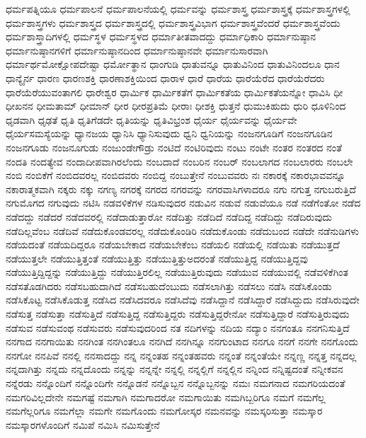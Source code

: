 {ಧರ್ಮಪತ್ನಿಯೂ
ಧರ್ಮಪಾಲನೆ
ಧರ್ಮಪಾಲನೆಯಲ್ಲಿ
ಧರ್ಮವನ್ನು
ಧರ್ಮಶಾಸ್ತ್ರ
ಧರ್ಮಶಾಸ್ತ್ರಕ್ಕೆ
ಧರ್ಮಶಾಸ್ತ್ರಗಳಲ್ಲಿ
ಧರ್ಮಶಾಸ್ತ್ರಗಳು
ಧರ್ಮಶಾಸ್ತ್ರದ
ಧರ್ಮಶಾಸ್ತ್ರದಲ್ಲಿ
ಧರ್ಮಶಾಸ್ತ್ರವಿಭಾಗ
ಧರ್ಮಶಾಸ್ತ್ರವೆಂದರೆ
ಧರ್ಮಶಾಸ್ತ್ರವೆಂದು
ಧರ್ಮಶಾಸ್ತ್ರಾದಿಗಳಲ್ಲಿ
ಧರ್ಮಸ್ಥಳ
ಧರ್ಮಸ್ಥಳದ
ಧರ್ಮಾತೀತವಾದದ್ದು
ಧರ್ಮಾಧಿಕಾರಿ
ಧರ್ಮಾನುಷ್ಠಾನ
ಧರ್ಮಾನುಷ್ಠಾನಗಳಿಗೆ
ಧರ್ಮಾನುಷ್ಠಾನದಿಂದ
ಧರ್ಮಾನುಷ್ಠಾನವೇ
ಧರ್ಮಾನುಸಾರವಾಗಿ
ಧರ್ಮಾರ್ಥಮೋಕ್ಷೋಪದೇಷ್ಟಾ
ಧರ್ಮೋತ್ಥಾನ
ಧಾಂಗುಡಿ
ಧಾತುವನ್ನೂ
ಧಾತುವಿನಿಂದ
ಧಾತುವಿನಿಂದಲೂ
ಧಾನ
ಧಾನ್ಯೈರ್ನ
ಧಾರಣ
ಧಾರಣಶಕ್ತಿ
ಧಾರಣಾಶಕ್ತಿಯಿಂದ
ಧಾರಾಳ
ಧಾರೆ
ಧಾರೆಯ
ಧಾರೆಯೆರೆದ
ಧಾರೆಯೆರೆದರು
ಧಾರೆಯೆರೆಯುವಂತಾಗಲಿ
ಧಾರೇಶ್ವರ
ಧಾರ್ಮಿಕ
ಧಾರ್ಮಿಕತೆಗೆ
ಧಾರ್ಮಿಕತೆಯ
ಧಾರ್ಮಿಕತೆಯನ್ನೋ
ಧಾವಿಸಿ
ಧೀ
ಧೀಖನನ
ಧೀಮತಾಮ್
ಧೀಮಾನ್
ಧೀರ
ಧೀರಪ್ರತಿಮೆ
ಧೀರಾಃ
ಧೀಶಕ್ತಿ
ಧುತ್ತನೆ
ಧುಮುಕಿಹುದು
ಧುರಿ
ಧೂಳಿನಿಂದ
ಧೃಡವಾಗಿ
ಧೃಢತೆ
ಧೃತಿ
ಧೃತಿಗೆಡದೇ
ಧೃತಿಯನ್ನು
ಧೃತಿವಿಭ್ರಂಶ
ಧೈರ್ಯ
ಧೈರ್ಯವನ್ನು
ಧೈರ್ಯವೇ
ಧೈರ್ಯಸಮಸ್ಯೆಯನ್ನು
ಧ್ಯಾನಜಯ
ಧ್ಯಾನಿಸಿ
ಧ್ಯಾನಿಸುವುದು
ಧ್ವನಿ
ಧ್ವನಿಯನ್ನು
ನಂಜನಗೂಡಿಗೆ
ನಂಜನಗೂಡಿನ
ನಂಜನಗೂಡು
ನಂಜನೂಗುಡು
ನಂಜುಂಡೇಗೌಡ್ರು
ನಂಟಿದೆ
ನಂಟಿರಿವುದು
ನಂಟು
ನಂಟೇ
ನಂತರ
ನಂತರದ
ನಂತೆ
ನಂದತಿ
ನಂದತ್ಯೇವ
ನಂದಾದೀಪವಾಗಿರಲೆಂದು
ನಂಬದಾದೆ
ನಂಬರಿನ
ನಂಬರ್
ನಂಬಲಾಗದ
ನಂಬಲಾರರು
ನಂಬಲೇ
ನಂಬಿ
ನಂಬಿಕೆಗೆ
ನಂಬಿದವರಲ್ಲ
ನಂಬಿದವರು
ನಂಬಿದ್ದ
ನಂಬುತ್ತೇನೆ
ನಂಬುವವರು
ನಃ
ನಕಾರಕ್ಕೆ
ನಕಾರಭಾವವನ್ನೂ
ನಕಾರಾತ್ಮಕವಾಗಿ
ನಕ್ಕರು
ನಕ್ಕು
ನಗಣ್ಯ
ನಗರಕ್ಕೆ
ನಗರದ
ನಗರವನ್ನು
ನಗರವಾಸಿಗಳಾದರೂ
ನಗು
ನಗುತ್ತ
ನಗುಬರುತ್ತಿದೆ
ನಗುಮೊಗದ
ನಗುವುದು
ನಟಿಸಿ
ನಡವಳಿಕೆಗಳ
ನಡಿಸುವುದರ
ನಡುವಿನ
ನಡುವೆ
ನಡುವೆಯೂ
ನಡೆ
ನಡೆಗೆಂತೋ
ನಡೆದ
ನಡೆದದ್ದು
ನಡೆದರೆ
ನಡೆದವರಲ್ಲಿ
ನಡೆದಾಡುತ್ತಾರೋ
ನಡೆದಿತ್ತು
ನಡೆದಿದೆ
ನಡೆದಿದ್ದ
ನಡೆದಿದ್ದು
ನಡೆದಿರುವುದು
ನಡೆದಿಲ್ಲವೆಂಬ
ನಡೆದಿವೆ
ನಡೆದುಕೊಂಡವರಲ್ಲ
ನಡೆದುಕೊಂಡಿರಿ
ನಡೆದುಕೊಂಡು
ನಡೆದುಬಂದ
ನಡೆದೇ
ನಡೆನುಡಿಗಳು
ನಡೆಯದಂತೆ
ನಡೆಯದಿದ್ದರೂ
ನಡೆಯಬೇಕಾದ
ನಡೆಯಬೇಕೆಂಬ
ನಡೆಯಲಿ
ನಡೆಯಲ್ಲಿ
ನಡೆಯಿತು
ನಡೆಯುತ್ತದೆ
ನಡೆಯುತ್ತಲೇ
ನಡೆಯುತ್ತಿತ್ತಂತೆ
ನಡೆಯುತ್ತಿತ್ತು
ನಡೆಯುತ್ತಿತ್ತುಅದರಂತೆ
ನಡೆಯುತ್ತಿದ್ದ
ನಡೆಯುತ್ತಿದ್ದವು
ನಡೆಯುತ್ತಿದ್ದಿದ್ದನ್ನು
ನಡೆಯುತ್ತಿದ್ದು
ನಡೆಯುತ್ತಿರಲಿಲ್ಲ
ನಡೆಯುತ್ತಿರುವುದು
ನಡೆಯುವ
ನಡೆಯುವಲ್ಲಿ
ನಡೆವಳಿಕೆಗಿಂತ
ನಡೆಸತೊಡಗಿದರು
ನಡೆಸಬಹುದಾಗಿದೆ
ನಡೆಸಬಹುದೆಂಬುದು
ನಡೆಸಲಾಗಿತ್ತು
ನಡೆಸಲು
ನಡೆಸಿ
ನಡೆಸಿಕೊಂಡು
ನಡೆಸಿಕೊಟ್ಟ
ನಡೆಸಿಕೊಡುತ್ತ
ನಡೆಸಿದ
ನಡೆಸಿದವರೂ
ನಡೆಸಿದೆವು
ನಡೆಸಿದ್ದಾನೆ
ನಡೆಸಿದ್ದಾರೆ
ನಡೆಸಿದ್ದುದು
ನಡೆಸಿರುವುದೇ
ನಡೆಸುತ್ತ
ನಡೆಸುತ್ತಾ
ನಡೆಸುತ್ತಿದೆ
ನಡೆಸುತ್ತಿದ್ದ
ನಡೆಸುತ್ತಿದ್ದರು
ನಡೆಸುತ್ತಿದ್ದರೇನೋ
ನಡೆಸುತ್ತಿದ್ದಾರೆ
ನಡೆಸುತ್ತಿರುವುದು
ನಡೆಸುವ
ನಡೆಸುವಂಥ
ನಡೆಸುವರು
ನಡೆಸುವುದರಿಂದ
ನತ
ನದಿಗಳನ್ನು
ನದಿಯ
ನದ್ಯಾಂ
ನನಗಂತೂ
ನನಗನಿಸುತ್ತಿದೆ
ನನಗಾದ
ನನಗಾಯಿತು
ನನಗಿಂತ
ನನಗಿಂತಲೂ
ನನಗಿದೆ
ನನಗಿನ್ನೂ
ನನಗುಂಟಾದ
ನನಗೂ
ನನಗೆ
ನನಗೇ
ನನಗೊಂದು
ನನಗೋ
ನನಪಿವೆ
ನನಲ್ಲಿ
ನನಸಾದದ್ದು
ನನ್ನ
ನನ್ನಂತಹ
ನನ್ನಂತಹವರು
ನನ್ನಂತೆ
ನನ್ನಂತೆಯೇ
ನನ್ನಣ್ಣ
ನನ್ನತ್ತ
ನನ್ನದಲ್ಲ
ನನ್ನದಾಗಿತ್ತು
ನನ್ನದು
ನನ್ನದೊಂದು
ನನ್ನನ್ನು
ನನ್ನನ್ನೇ
ನನ್ನಲ್ಲಿ
ನನ್ನಲ್ಲಿಗೆ
ನನ್ನಲ್ಲಿನ
ನನ್ನಿಂದ
ನನ್ನಿಷ್ಟದಂತೆ
ನನ್ನೀಕವನ
ನನ್ನೆರಡು
ನನ್ನೊಂದಿಗೆ
ನನ್ನೊಂದಿಗೇ
ನನ್ನೊಡನೆ
ನನ್ನೊಬ್ಬನ
ನನ್ನೊಬ್ಬನನ್ನು
ನಮಃ
ನಮಗನಾದ
ನಮಗರಿಯದಂತೆ
ನಮಗರಿವಿಲ್ಲದೇನೇ
ನಮಗಷ್ಟೆ
ನಮಗಾಗಿ
ನಮಗಾದರೋ
ನಮಗಾಯಿತು
ನಮಗಿಬ್ಬರಿಗೂ
ನಮಗೆ
ನಮಗೆಲ್ಲ
ನಮಗೆಲ್ಲರಿಗೂ
ನಮಗೆಲ್ಲಾ
ನಮಗೇ
ನಮಗೊಂದು
ನಮಗೋಸ್ಕರ
ನಮನವನ್ನು
ನಮಸ್ಕರಿಸುತ್ತಾ
ನಮಸ್ಕಾರ
ನಮಸ್ಕಾರಗಳೊಂದಿಗೆ
ನಮಿಪೆ
ನಮಿಸಿ
ನಮಿಸುತ್ತೇನೆ
}
